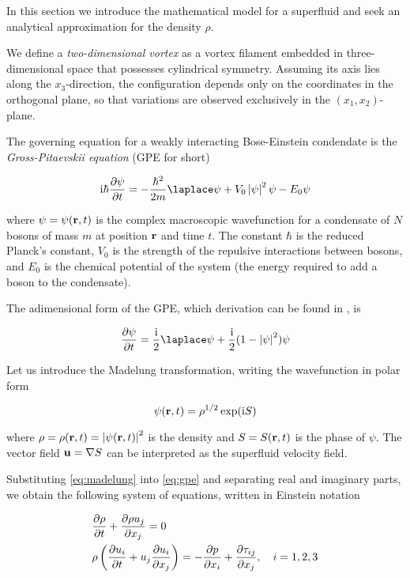 In this section we introduce the mathematical model for a superfluid and seek an analytical approximation for the density $\rho$.

We define a \emph{two-dimensional vortex} as a vortex filament embedded in three-dimensional space that possesses cylindrical symmetry. Assuming its axis lies along the $x_3$-direction, the configuration depends only on the coordinates in the orthogonal plane, so that variations are observed exclusively in the $(x_1,x_2)$-plane.

The governing equation for a weakly interacting Bose-Einstein condendate is the \emph{Gross-Pitaevskii equation} (GPE for short)

\begin{equation*}
    \ii \hbar \pdv{\psi}{t} = -\frac{\hbar^2}{2m}\lap\psi + V_0\abs{\psi}^2 \psi - E_0 \psi
\end{equation*}

where $\psi = \psi(\mathbf{r}, t)$ is the complex macroscopic wavefunction for a condensate of $N$ bosons of mass $m$ at position $\mathbf{r}$ and time $t$. The constant $\hbar$ is the reduced Planck's constant, $V_0$ is the strength of the repulsive interactions between bosons, and $E_0$ is the chemical potential of the system (the energy required to add a boson to the condensate).

The adimensional form of the GPE, which derivation can be found in \cite{CZ12}, is

\begin{equation}
    \pdv{\psi}{t} = \frac\ii2\lap\psi + \frac\ii2 (1 - \abs{\psi}^2)\psi
    \label{eq:gpe}
\end{equation}

Let us introduce the Madelung transformation, writing the wavefunction in polar form

\begin{equation}
    \psi(\mathbf{r}, t) = \rho^{1/2}\exp(\mathrm{i} S)
    \label{eq:madelung}
\end{equation}

where $\rho = \rho(\mathbf{r}, t) = \left| \psi(\mathbf{r}, t) \right|^2$ is the density and $S = S(\mathbf{r}, t)$ is the phase of $\psi$. The vector field $\mathbf{u} = \mathbf{\nabla} S$ can be interpreted as the superfluid velocity field.

\medskip

Substituting \eqref{eq:madelung} into \eqref{eq:gpe} and separating real and imaginary parts, we obtain the following system of equations, written in Einstein notation

\begin{align*}
    &\frac{\partial \rho}{\partial t} + \frac{\partial \rho u_j}{\partial x_j} = 0 \\
    &\rho \left(\frac{\partial u_i}{\partial t} + u_j \frac{\partial u_i}{\partial x_j}\right) = -\frac{\partial p}{\partial x_i} + \frac{\partial \tau_{ij}}{\partial x_j}, \quad i = 1,2,3
\end{align*}

